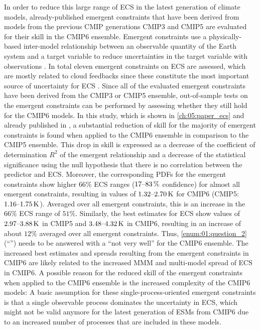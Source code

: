 In order to reduce this large range of \ac{ECS} in the latest generation of
climate  models, already-published emergent constraints that have been derived
from models from the previous \ac{CMIP} generations \acs{CMIP}3 and \acs{CMIP}5
are evaluated for their skill in the \acs{CMIP}6 ensemble. Emergent constraints
use a physically-based inter-model relationship between an observable quantity
of the Earth system and a target variable to reduce uncertainties in the target
variable with observations \autocite{Allen2002}. In total eleven emergent
constraints on \ac{ECS} are assessed, which are mostly related to cloud
feedbacks since these constitute the most important source of uncertainty for
\ac{ECS} \autocite{Boucher2013, Flato2013}. Since all of the evaluated emergent
constraints have been derived from the \acs{CMIP}3 or \acs{CMIP}5 ensemble,
out-of-sample tests on the emergent constraints can be performed by assessing
whether they still hold for the \acs{CMIP}6 models. In this study, which is
shown in \cref{ch:05:paper_ecs} and already published in
\textcite{Schlund2020a}, a substantial reduction of skill for the majority of
emergent constraints is found when applied to the \acs{CMIP}6 ensemble in
comparison to the \acs{CMIP}5 ensemble. This drop in skill is expressed as a
decrease of the coefficient of determination $R^2$ of the emergent relationship
and a decrease of the statistical significance using the null hypothesis that
there is no correlation between the predictor and \ac{ECS}. Moreover, the
corresponding \acp{PDF} for the emergent constraints show higher $66 \unit{\%}$
\ac{ECS} ranges ($\rangeunit{17}{83}{\%}$ confidence) for almost all emergent
constraints, resulting in values of $\rangeunit{1.32}{2.70}{K}$ for \acs{CMIP}6
(\acs{CMIP}5: $\rangeunit{1.16}{1.75}{K}$). Averaged over all emergent
constraints, this is an increase in the $66 \unit{\%}$ \ac{ECS} range of $51
\unit{\%}$. Similarly, the best estimates for \ac{ECS} show values of
$\rangeunit{2.97}{3.88}{K}$ in \acs{CMIP}5 and $\rangeunit{3.48}{4.32}{K}$ in
\acs{CMIP}6, resulting in an increase of about $12 \unit{\%}$ averaged over all
emergent constraints. Thus, \cref{enum:01:question_2}
(\enquote{\KeyScienceQuestionTwo{}}) needs to be answered with a \enquote{not
  very well} for the \acs{CMIP}6 ensemble. The increased best estimates and
spreads resulting from the emergent constraints in \acs{CMIP}6 are likely
related to the increased \ac{MMM} and multi-model spread of \ac{ECS} in
\acs{CMIP}6. A possible reason for the reduced skill of the emergent
constraints when applied to the \acs{CMIP}6 ensemble is the increased
complexity of the \acs{CMIP}6 models: A basic assumption for these
single-process-oriented emergent constraints is that a single observable
process dominates the uncertainty in \ac{ECS}, which might not be valid anymore
for the latest generation of \acp{ESM} from \acs{CMIP}6 due to an increased
number of processes that are included in these models.

